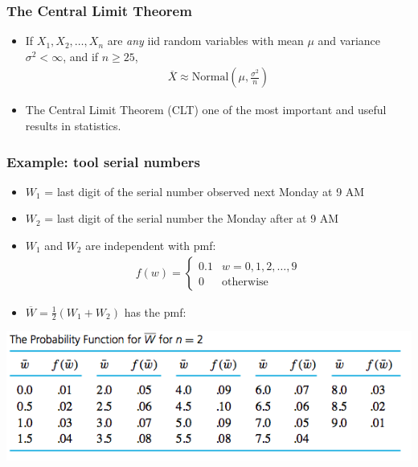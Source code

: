 \documentclass[handout]{beamer}\usepackage[]{graphicx}\usepackage[]{color}
\providecommand{\ov}[1]{\overline{#1}}
\numberwithin{equation}{section}
\begin{document}
\begin{frame}
\frametitle{The Central Limit Theorem}
\begin{itemize}
\pause \item If $X_1, X_2, \ldots, X_n$ are \emph{any} iid random variables with mean $\mu$ and variance $\sigma^2 < \infty$, and if $n \ge 25$, 
\pause \begin{align*}
\ov{X} \approx \text{Normal} \left (\mu, \frac{\sigma^2}{n} \right)
\end{align*}
\pause \item The Central Limit Theorem (CLT) one of the most important and useful results in statistics.
\end{itemize}
\end{frame}


\begin{frame}
\frametitle{Example: tool serial numbers}
\begin{itemize}
\pause \item $W_1$ = last digit of the serial number observed next Monday at 9 AM
\pause \item $W_2$ = last digit of the serial number the Monday after at 9 AM
\pause \item $W_1 $ and $ W_2$ are independent with pmf:
\pause \begin{align*}
f(w) = \begin{cases}
0.1 & w = 0, 1, 2, \ldots, 9 \\
0 & \text{otherwise} 
\end{cases}
\end{align*}
\pause \item $\ov{W} = \frac{1}{2}(W_1 + W_2)$ has the pmf:
\end{itemize}
 \includegraphics{../../fig/wpmf.png}
\end{frame}
\end{document}
